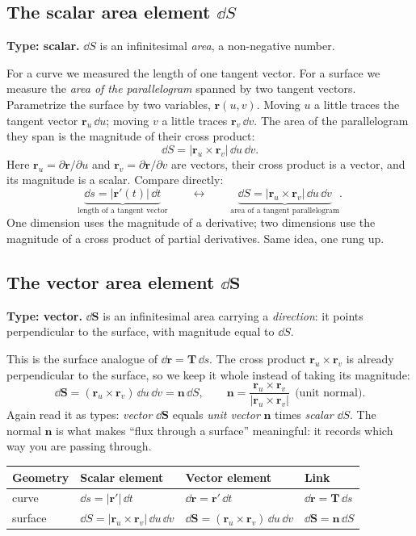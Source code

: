 \documentclass{essay}
\newcommand{\rr}{\mathbf{r}}
\newcommand{\nn}{\mathbf{n}}
\newcommand{\TT}{\mathbf{T}}
\begin{document}
\subsection{The scalar area element $\dd S$}

\textbf{Type: scalar.} $\dd S$ is an infinitesimal \emph{area}, a non-negative
number.

For a curve we measured the length of one tangent vector. For a surface we measure
the \emph{area of the parallelogram} spanned by two tangent vectors. Parametrize the
surface by two variables, $\rr(u,v)$. Moving $u$ a little traces the tangent vector
$\rr_u\,\dd u$; moving $v$ a little traces $\rr_v\,\dd v$. The area of the
parallelogram they span is the magnitude of their cross product:
\[
\dd S = \bigl\lvert \rr_u \times \rr_v \bigr\rvert \,\dd u\,\dd v .
\]
Here $\rr_u=\partial\rr/\partial u$ and $\rr_v=\partial\rr/\partial v$ are vectors,
their cross product is a vector, and its magnitude is a scalar. Compare directly:
\[
\underbrace{\dd s = \lvert\rr'(t)\rvert\,\dd t}_{\text{length of a tangent vector}}
\qquad\longleftrightarrow\qquad
\underbrace{\dd S = \lvert\rr_u\times\rr_v\rvert\,\dd u\,\dd v}_{\text{area of a tangent parallelogram}} .
\]
One dimension uses the magnitude of a derivative; two dimensions use the magnitude
of a cross product of partial derivatives. Same idea, one rung up.

\subsection{The vector area element $\dd\mathbf{S}$}

\textbf{Type: vector.} $\dd\mathbf{S}$ is an infinitesimal area carrying a
\emph{direction}: it points perpendicular to the surface, with magnitude equal to
$\dd S$.

This is the surface analogue of $\dd\mathbf{r}=\TT\,\dd s$. The cross product
$\rr_u\times\rr_v$ is already perpendicular to the surface, so we keep it whole
instead of taking its magnitude:
\[
\dd\mathbf{S} = (\rr_u \times \rr_v)\,\dd u\,\dd v = \nn\,\dd S,
\qquad
\nn = \frac{\rr_u\times\rr_v}{\lvert\rr_u\times\rr_v\rvert}\ \ \text{(unit normal).}
\]
Again read it as types: \emph{vector} $\dd\mathbf{S}$ equals \emph{unit vector}
$\nn$ times \emph{scalar} $\dd S$. The normal $\nn$ is what makes ``flux through a
surface'' meaningful: it records which way you are passing through.

\begin{center}
\renewcommand{\arraystretch}{1.35}
\begin{tabular}{@{}l l l l@{}}
\toprule
\textbf{Geometry} & \textbf{Scalar element} & \textbf{Vector element} & \textbf{Link} \\
\midrule
curve   & $\dd s = \lvert\rr'\rvert\,\dd t$
        & $\dd\mathbf{r}=\rr'\,\dd t$
        & $\dd\mathbf{r}=\TT\,\dd s$ \\
surface & $\dd S=\lvert\rr_u\times\rr_v\rvert\,\dd u\,\dd v$
        & $\dd\mathbf{S}=(\rr_u\times\rr_v)\,\dd u\,\dd v$
        & $\dd\mathbf{S}=\nn\,\dd S$ \\
\bottomrule
\end{tabular}
\end{center}
\end{document}
